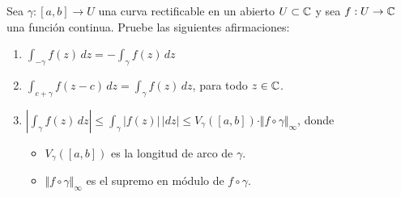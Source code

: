 \begin{exercise}
Sea $\gamma : [a,b] \to U$ una curva rectificable en un abierto $U \subset \mathbb C$ y sea $f : U \to \mathbb C$ una función continua. Pruebe las siguientes afirmaciones:
\begin{enumerate}[label=(\alph*)]
    \item $\displaystyle \int_{-\gamma} f(z) \, dz = -\int_\gamma f(z) \, dz$
    \item $\displaystyle \int_{c+\gamma} f(z-c) \, dz = \int_\gamma f(z) \, dz$, para todo $z \in \mathbb C$.
    \item $\displaystyle \left| \int_\gamma f(z) \, dz \right| \le \int_\gamma |f(z)| \, |dz| \le V_\gamma([a,b]) \cdot \Vert f \circ \gamma \Vert_\infty$, donde
    \begin{itemize}
        \item $V_\gamma([a,b])$ es la longitud de arco de $\gamma$.
        \item $\Vert f \circ \gamma \Vert_\infty$ es el supremo en módulo de $f \circ \gamma$.
    \end{itemize}
\end{enumerate}
\end{exercise}

